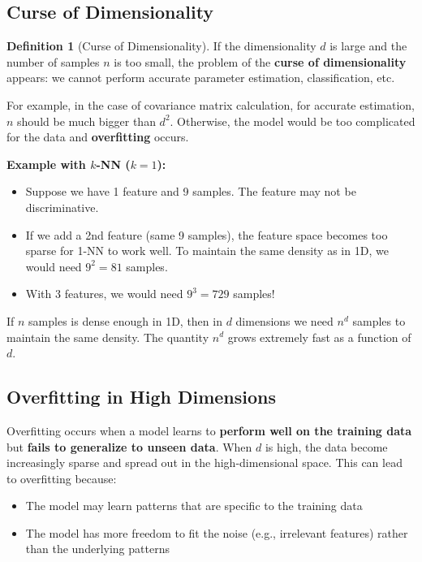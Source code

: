 \documentclass[11pt,a4paper]{article}
\theoremstyle{definition}
\newtheorem{definition}{Definition}[section]
\theoremstyle{plain}
\theoremstyle{remark}
\begin{document}
\subsection{Curse of Dimensionality}

\begin{definition}[Curse of Dimensionality]
If the dimensionality $d$ is large and the number of samples $n$ is too small, the problem of the \textbf{curse of dimensionality} appears: we cannot perform accurate parameter estimation, classification, etc.
\end{definition}

For example, in the case of covariance matrix calculation, for accurate estimation, $n$ should be much bigger than $d^2$. Otherwise, the model would be too complicated for the data and \textbf{overfitting} occurs.

\textbf{Example with $k$-NN ($k=1$):}
\begin{itemize}
    \item Suppose we have 1 feature and 9 samples. The feature may not be discriminative.
    \item If we add a 2nd feature (same 9 samples), the feature space becomes too sparse for 1-NN to work well. To maintain the same density as in 1D, we would need $9^2 = 81$ samples.
    \item With 3 features, we would need $9^3 = 729$ samples!
\end{itemize}

\begin{tcolorbox}[colback=red!5!white,colframe=red!75!black,title=\textbf{Key Rule}]
If $n$ samples is dense enough in 1D, then in $d$ dimensions we need $n^d$ samples to maintain the same density. The quantity $n^d$ grows extremely fast as a function of $d$.
\end{tcolorbox}

\subsection{Overfitting in High Dimensions}

Overfitting occurs when a model learns to \textbf{perform well on the training data} but \textbf{fails to generalize to unseen data}. When $d$ is high, the data become increasingly sparse and spread out in the high-dimensional space. This can lead to overfitting because:
\begin{itemize}
    \item The model may learn patterns that are specific to the training data
    \item The model has more freedom to fit the noise (e.g., irrelevant features) rather than the underlying patterns
\end{itemize}
\end{document}
